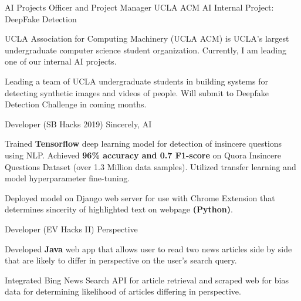
\begin{cventries}

    \cventry
    {AI Projects Officer and Project Manager} 
    {UCLA ACM AI Internal Project: DeepFake Detection}
    {}
    {}
    {
      \begin{cvitems} 
        \item UCLA Association for Computing Machinery (UCLA ACM) is UCLA's largest undergraduate computer science 
        student organization. Currently, I am leading one of our internal AI projects.
        \item {Leading a team of UCLA undergraduate students in building systems
        for detecting synthetic images and videos of people. Will submit to Deepfake Detection Challenge in coming months.}
      \end{cvitems}
    }

    \cventry
    {Developer (SB Hacks 2019)} %
    {Sincerely, AI} %
    {} %
    {} %
    {
      \begin{cvitems} %
        \item {Trained \textbf{Tensorflow} deep learning model for detection of insincere questions using 
        NLP. Achieved \textbf{96\% accuracy and 0.7 F1-score} on Quora Insincere 
        Questions Dataset (over 1.3 Million data samples). Utilized transfer learning and model hyperparameter fine-tuning.}
        \item {Deployed model on Django web server for use with Chrome Extension that determines
        sincerity of highlighted text on webpage \textbf{(Python)}.}
      \end{cvitems}
    }

  \cventry
    {Developer (EV Hacks II)} %
    {Perspective} %
    {} %
    {} %
    {
      \begin{cvitems} %
        \item {Developed \textbf{Java} web app that allows user to read two news articles side by side 
        that are likely to differ in perspective on the user's search query. }
        \item{Integrated Bing News Search API for article retrieval and scraped web for bias data for determining likelihood of articles differing in perspective.}
      \end{cvitems}
    }

\end{cventries}
